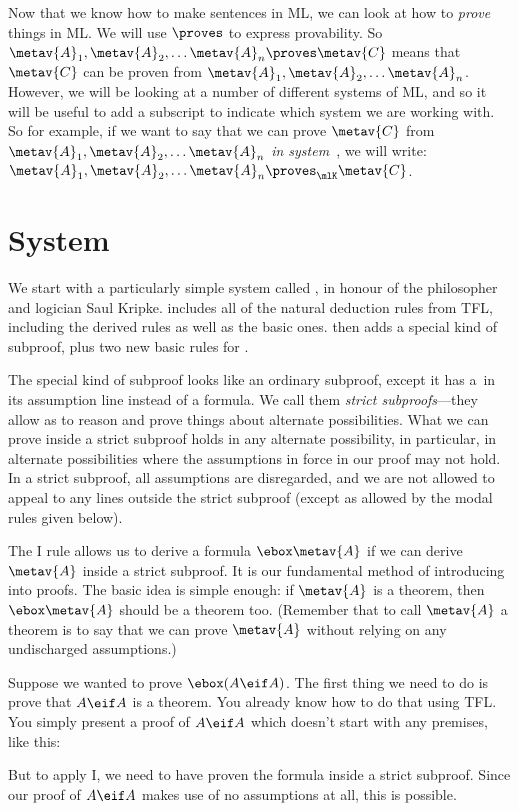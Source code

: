 Now that we know how to make sentences in ML, we can look at how to \emph{prove} things in ML. We will use $\proves$ to express provability.  So $\metav{A}_1,\metav{A}_2, \dots \metav{A}_n \proves \metav{C}$ means that $\metav{C}$ can be proven from $\metav{A}_1,\metav{A}_2, \dots \metav{A}_n$. However, we will be looking at a number of different systems of ML, and so it will be useful to add a subscript to indicate which system we are working with. So for example, if we want to say that we can prove $\metav{C}$ from $\metav{A}_1,\metav{A}_2, \dots \metav{A}_n$ \emph{in system}~\mlK, we will write: $\metav{A}_1,\metav{A}_2, \dots \metav{A}_n \proves_\mlK \metav{C}$.

\section{System \mlK}
\label{K}

We start with a particularly simple system called \mlK, in honour of the philosopher and logician Saul Kripke. \mlK{} includes all of the natural deduction rules from TFL, including the derived rules as well as the basic ones. \mlK{} then adds a special kind of subproof, plus two new basic rules for \ebox.

The special kind of subproof looks like an ordinary subproof, except it has a~\ebox in its assumption line instead of a formula. We call them \emph{strict subproofs}---they allow as to reason and prove things about alternate possibilities. What we can prove inside a strict subproof holds in any alternate possibility, in particular, in alternate possibilities where the assumptions in force in our proof may not hold. In a strict subproof, all assumptions are disregarded, and we are not allowed to appeal to any lines outside the strict subproof (except as allowed by the modal rules given below).

The \ebox I rule allows us to derive a formula $\ebox \metav{A}$ if we can derive $\metav{A}$ inside a strict subproof.  It is our fundamental method of introducing \ebox{} into proofs. The basic idea is simple enough: if $\metav{A}$ is a theorem, then $\ebox \metav{A}$ should be a theorem too. (Remember that to call $\metav{A}$ a theorem is to say that we can prove $\metav{A}$ without relying on any undischarged assumptions.)

Suppose we wanted to prove $\ebox(A\eif A)$. The first thing we need to do is prove that $A\eif A$ is a theorem. You already know how to do that using TFL. You simply present a proof of $A\eif A$ which doesn't start with any premises, like this:
\begin{fitchproof}
		\open
		\AS
		\close
\end{fitchproof}
But to apply \ebox I, we need to have proven the formula inside a strict subproof.  Since our proof of $A \eif A$ makes use of no assumptions at all, this is possible.
\begin{fitchproof}
		\open
		\AS
		\open
		\AS
		\close
		\close
\end{fitchproof}

